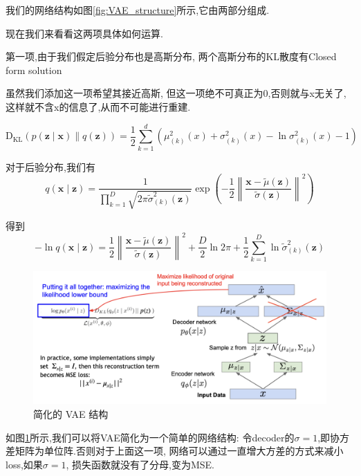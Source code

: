 	我们的网络结构如图\ref{fig:VAE_structure}所示,它由两部分组成.

	现在我们来看看这两项具体如何运算.
	
	第一项,由于我们假定后验分布也是高斯分布,
	两个高斯分布的KL散度有Closed form solution

	虽然我们添加这一项希望其接近高斯,
	但这一项绝不可真正为0,否则就与x无关了,这样就不含x的信息了,从而不可能进行重建.
	
	\begin{equation}
		\operatorname{D_{KL}}(p(\bm z \mid \bm x) \| q(\bm z))=\frac{1}{2} \sum_{k=1}^{d}\left(\mu_{(k)}^{2}(x)+\sigma_{(k)}^{2}(x)-\ln \sigma_{(k)}^{2}(x)-1\right)
	\end{equation}
	
	对于后验分布,我们有
	\begin{equation}
		q(\bm x \mid \bm z)=\frac{1}{\prod_{k=1}^{D} \sqrt{2 \pi \tilde{\sigma}_{(k)}^{2}(\bm z)}} \exp \left(-\frac{1}{2}\left\|\frac{\bm x-\tilde{\mu}(\bm z)}{\tilde{\sigma}(\bm z)}\right\|^{2}\right)
	\end{equation}

	得到
	\begin{equation}
		-\ln q(\bm x \mid \bm z)=\frac{1}{2}\left\|\frac{\bm x-\tilde{\mu}(\bm z)}{\tilde{\sigma}(\bm z)}\right\|^{2}+\frac{D}{2} \ln 2 \pi+\frac{1}{2} \sum_{k=1}^{D} \ln \tilde{\sigma}_{(k)}^{2}(\bm z)
	\end{equation}

	\begin{figure}[htbp]
		\centering
		\includegraphics[scale=0.3]{figures/simple_VAE.png}
		\caption{简化的 VAE 结构}
		\label{fig:simple_VAE}
	\end{figure}

	如图\ref{fig:simple_VAE}所示,我们可以将VAE简化为一个简单的网络结构:
	令decoder的$\sigma = 1$,即协方差矩阵为单位阵.否则对于上面这一项,
	网络可以通过一直增大方差的方式来减小loss,如果$\sigma = 1$,
	损失函数就没有了分母,变为MSE.


